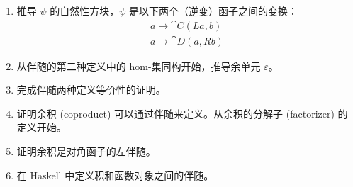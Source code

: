 \begin{enumerate}
  \tightlist
  \item
        推导 $\psi$ 的自然性方块，$\psi$ 是以下两个（逆变）函子之间的变换：
        \begin{gather*}
          a \to \cat{C}(L a, b) \\
          a \to \cat{D}(a, R b)
        \end{gather*}
  \item
        从伴随的第二种定义中的 hom-集同构开始，推导余单元 $\varepsilon$。
  \item
        完成伴随两种定义等价性的证明。
  \item
        证明余积 (coproduct) 可以通过伴随来定义。从余积的分解子 (factorizer) 的定义开始。
  \item
        证明余积是对角函子的左伴随。
  \item
        在 Haskell 中定义积和函数对象之间的伴随。
\end{enumerate}